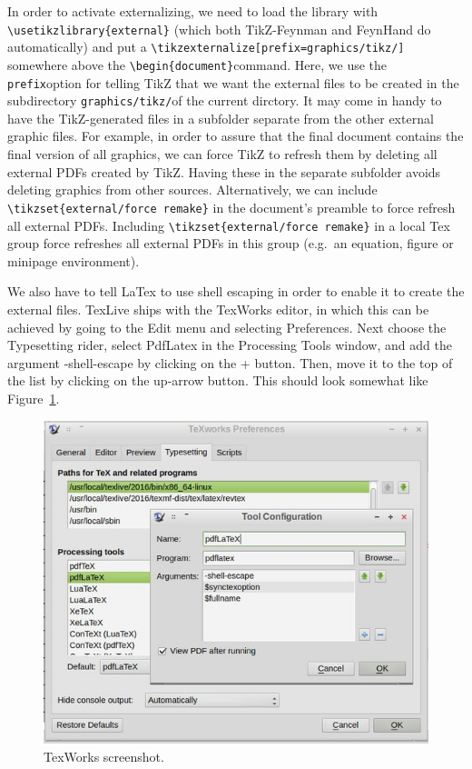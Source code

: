 \documentclass[10pt,letterpaper,twoside,notitlepage]{article}
\numberwithin{figure}{section}
\begin{document}
In order to activate externalizing, we need to load the library with
\brocol\verb$\usetikzlibrary{external}$\txcol
(which both TikZ-Feynman and FeynHand do automatically)
and put a \brocol\verb$\tikzexternalize[prefix=graphics/tikz/]$\txcol
somewhere above the \brocol\verb$\begin{document}$\txcol command.
Here, we use the \brocol\verb$prefix$\txcol option
for telling TikZ that we want the external files to be created
in the subdirectory \brocol\verb$graphics/tikz/$\txcol of the current dirctory.
It may come in handy to have the TikZ-generated files
in a subfolder separate from the other external graphic files.
For example, in order to assure that the final document contains
the final version of all graphics, we can force TikZ to refresh them
by deleting all external PDFs created by TikZ.
Having these in the separate subfolder avoids deleting graphics from other sources.
Alternatively, we can include \brocol\verb$\tikzset{external/force remake}$\txcol
in the document's preamble to force refresh all external PDFs.
Including \brocol\verb$\tikzset{external/force remake}$\txcol
in a local Tex group force refreshes all external PDFs in this group
(e.g.~an equation, figure or minipage environment).

We also have to tell LaTex to use shell escaping
in order to enable it to create the external files.
TexLive ships with the TexWorks editor, in which this can be achieved
by going to the Edit menu and selecting Preferences.
Next choose the Typesetting rider, select PdfLatex in
the Processing Tools window, and add the argument
-shell-escape by clicking on the + button.
Then, move it to the top of the list by clicking on the up-arrow button.
This should look somewhat like Figure~\ref{Fig:_shell_escape}.
%
\begin{figure}
	\centering
	\includegraphics[width=0.7\linewidth]{shell_escape.jpg}
	\caption{TexWorks screenshot.}
	\label{Fig:_shell_escape}
\end{figure}
\end{document}
